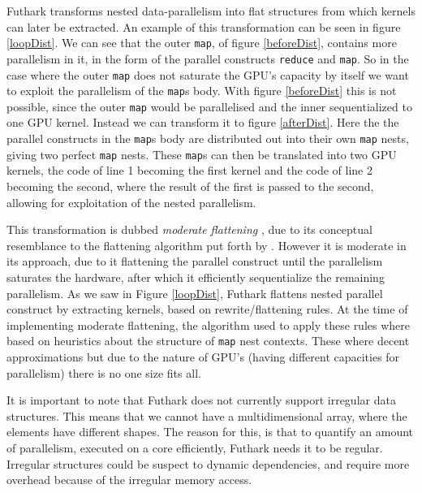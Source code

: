 \noindent Futhark transforms nested data-parallelism into flat structures from
which kernels can later be extracted. An example of this transformation can
be seen in figure \ref{loopDist}. We can see that the outer \texttt{map}, of
figure \ref{beforeDist}, contains more parallelism in it, in the form of the
parallel constructs \texttt{reduce} and \texttt{map}. So in the case where the
outer \texttt{map} does not saturate the GPU's capacity by itself we want to
exploit the parallelism of the \texttt{map}s body. With figure \ref{beforeDist}
this is not possible, since the outer \texttt{map} would be parallelised and
the inner sequentialized to one GPU kernel. Instead we can transform it to
figure \ref{afterDist}. Here the the parallel constructs in the \texttt{map}s
body are distributed out into their own \texttt{map} nests, giving two perfect
\texttt{map} nests. These \texttt{map}s can then be translated into two GPU
kernels, the code of line 1 becoming the first kernel and the code of line 2
becoming the second, where the result of the first is passed to the second,
allowing for exploitation of the nested parallelism.

This transformation is dubbed \textit{moderate flattening}
\cite{futhark-nested-para}, due to its conceptual resemblance to the flattening
algorithm put forth by \citeauthor{flat} \cite{flat}. However it is moderate in
its approach, due to it flattening the parallel construct until the parallelism
saturates the hardware, after which it efficiently sequentialize the remaining
parallelism. As we saw in Figure \ref{loopDist}, Futhark flattens nested
parallel construct by extracting kernels, based on rewrite/flattening rules. At
the time of implementing moderate flattening, the algorithm used to apply these
rules where based on heuristics about the structure of \texttt{map} nest
contexts. These where decent approximations but due to the nature of GPU's
(having different capacities for parallelism) there is no one size fits all.

It is important to note that Futhark does not currently support irregular data
structures. This means that we cannot have a multidimensional array, where the
elements have different shapes. The reason for this, is that to quantify an
amount of parallelism, executed on a core efficiently, Futhark needs it to be
regular. Irregular structures could be suspect to dynamic dependencies, and
require more overhead because of the irregular memory access.  

